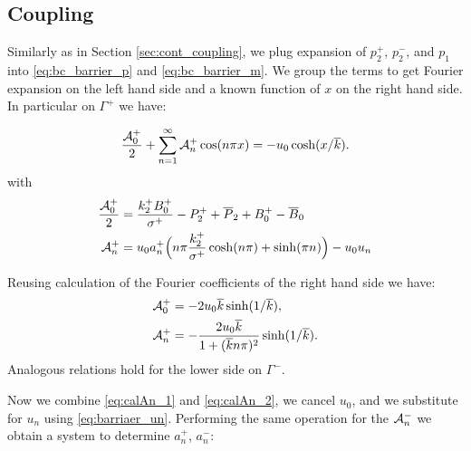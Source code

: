 \documentclass[a4paper,10pt]{article}
\def\ol#1{\overline{#1}}
\begin{document}
\subsection{Coupling}

Similarly as in Section \ref{sec:cont_coupling}, we plug expansion of $p_2^+$, $p_2^-$, and $p_1$ into \eqref{eq:bc_barrier_p} and \eqref{eq:bc_barrier_m}. 
We group the terms to get Fourier expansion on the left hand side and a known function of $x$ on the right hand side.
In particular on  $\Gamma^+$ we have:
% 

\begin{equation}
    \label{eq:fourier_coupling}
    \frac{{\cal A}_0^+}{2} + \sum^{\infty}_{n=1} {\cal A}_n^+ \cos (n\pi x) =  - u_0 \cosh(x/ \ol{k}).
\end{equation}
with
\begin{align}
    \label{eq:calA0_1}
    \frac{{\cal A}_0^+}{2} &= \frac{k_2^+ B_0^+}{\sigma^+} - P_2^+ + \ol{P}_2 + B_0^+ - \ol{B}_0\\
    \label{eq:calAn_1}
    {\cal A}_n^+          &=  u_0a_n^+ \Big( n \pi \frac{k_2^+ }{\sigma^+}  \cosh(n \pi) 
        +     \sinh(\pi n)  \Big) 
        - u_0u_n   
\end{align}

Reusing calculation of the Fourier coefficients of the right hand side we have: 
\begin{align}
    \label{eq:calA0_2}
    {\cal A}_0^+ &= - 2 u_0 \ol{k}\sinh( 1/\ol{k} ), \\
    \label{eq:calAn_2}
    {\cal A}_n^+ &=  -\frac{2u_0 \ol{k}}{1+(\ol{k} n \pi)^2}\sinh(1/\ol{k}).
\end{align}
Analogous relations hold for the lower side on $\Gamma^-$.

Now we combine \eqref{eq:calAn_1} and \eqref{eq:calAn_2}, we cancel $u_0$, and we substitute for $u_n$ using \eqref{eq:barriaer_un}.
Performing the same operation for the ${\cal A}_n^-$  we obtain a system to determine $a_n^+$, $a_n^-$:
\end{document}
